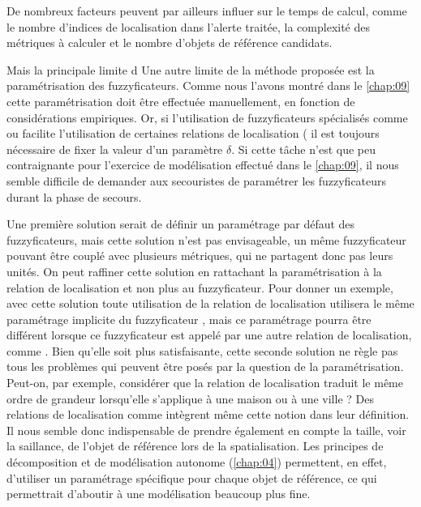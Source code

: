 De nombreux facteurs peuvent par ailleurs influer sur le temps de
calcul, comme le nombre d'indices de localisation dans l'alerte
traitée, la complexité des métriques à calculer et le nombre d'objets
de référence candidats.


Mais la principale limite d
%
Une autre limite de la méthode proposée est la paramétrisation des
fuzzyficateurs. Comme nous l'avons montré dans le \autoref{chap:09}
cette paramétrisation doit être effectuée manuellement, en fonction de
considérations empiriques. Or, si l'utilisation de fuzzyficateurs
spécialisés comme  ou 
facilite l'utilisation de certaines relations de localisation (\eg
{} il est toujours nécessaire de fixer la valeur
d'un paramètre \(\delta\). Si cette tâche n'est que peu contraignante
pour l'exercice de modélisation effectué dans le \autoref{chap:09}, il
nous semble difficile de demander aux secouristes de paramétrer les
fuzzyficateurs durant la phase de secours.

Une première solution serait de définir un paramétrage par défaut des
fuzzyficateurs, mais cette solution n'est pas envisageable, un même
fuzzyficateur pouvant être couplé avec plusieurs métriques, qui ne
partagent donc pas leurs unités.
%
On peut raffiner cette solution en rattachant la paramétrisation à la
relation de localisation et non plus au fuzzyficateur. Pour donner un
exemple, avec cette solution toute utilisation de la relation de
localisation  utilisera le même paramétrage
implicite du fuzzyficateur , mais ce
paramétrage pourra être différent lorsque ce fuzzyficateur est appelé
par une autre relation de localisation, comme
. Bien qu'elle soit plus
satisfaisante, cette seconde solution ne règle pas tous les problèmes
qui peuvent être posés par la question de la paramétrisation. Peut-on,
par exemple, considérer que la relation de localisation
 traduit le même ordre de grandeur lorsqu'elle
s'applique à une maison ou à une ville ? Des relations de localisation
comme  intègrent même cette notion dans
leur définition. Il nous semble donc indispensable de prendre
également en compte la taille, voir la saillance, de l'objet de
référence lors de la spatialisation. Les principes de décomposition et
de modélisation autonome (\autoref{chap:04}) permettent, en effet,
d'utiliser un paramétrage spécifique pour chaque objet de référence,
ce qui permettrait d'aboutir à une modélisation beaucoup plus fine.

